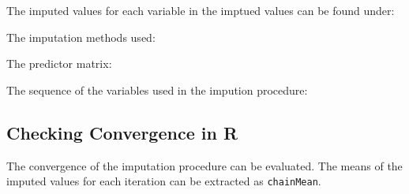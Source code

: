\documentclass[
]{book}
\newenvironment{Shaded}{\begin{snugshade}}{\end{snugshade}}
\newcommand{\NormalTok}[1]{#1}
\newcommand{\OperatorTok}[1]{\textcolor[rgb]{0.81,0.36,0.00}{\textbf{#1}}}
\begin{document}
The imputed values for each variable in the imptued values can be found under:

\begin{Shaded}
\end{Shaded}

The imputation methods used:

\begin{Shaded}
\end{Shaded}

The predictor matrix:

\begin{Shaded}
\end{Shaded}

The sequence of the variables used in the impution procedure:

\begin{Shaded}
\end{Shaded}

\hypertarget{checking-convergence-in-r}{%
\subsection{Checking Convergence in R}\label{checking-convergence-in-r}}

The convergence of the imputation procedure can be evaluated. The means of the imputed values for each iteration can be extracted as \texttt{chainMean}.

\begin{Shaded}
\end{Shaded}
\end{document}
